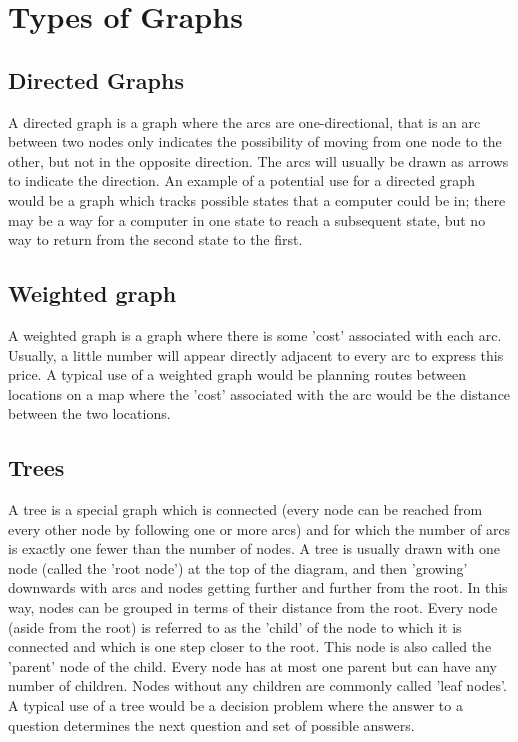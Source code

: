 \documentclass[]{article}
\title{}
\author{}
\begin{document}
\section{Types of Graphs}

\subsection{Directed Graphs}
A directed graph is a graph where the arcs are one-directional, that is an arc between two nodes only indicates the possibility of moving from one node to the other, but not in the opposite direction. The arcs will usually be drawn as arrows to indicate the direction. An example of a potential use for a directed graph would be a graph which tracks possible states that a computer could be in; there may be a way for a computer in one state to reach a subsequent state, but no way to return from the second state to the first.

\subsection{Weighted graph}
A weighted graph is a graph where there is some 'cost' associated with each arc. Usually, a little number will appear directly adjacent to every arc to express this price. A typical use of a weighted graph would be planning routes between locations on a map where the 'cost' associated with the arc would be the distance between the two locations.

\subsection{Trees}
A tree is a special graph which is connected (every node can be reached from every other node by following one or more arcs) and for which the number of arcs is exactly one fewer than the number of nodes. A tree is usually drawn with one node (called the 'root node') at the top of the diagram, and then 'growing' downwards with arcs and nodes getting further and further from the root. In this way, nodes can be grouped in terms of their distance from the root. Every node (aside from the root) is referred to as the 'child' of the node to which it is connected and which is one step closer to the root. This node is also called the 'parent' node of the child. Every node has at most one parent but can have any number of children. Nodes without any children are commonly called 'leaf nodes'. A typical use of a tree would be a decision problem where the answer to a question determines the next question and set of possible answers.
\end{document}
